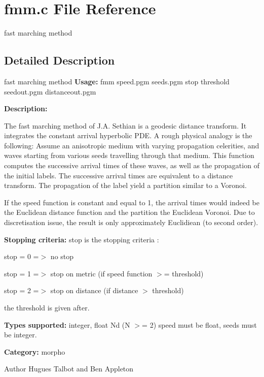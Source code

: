 \section{fmm.c File Reference}
\label{fmm_8c}


fast marching method  




\subsection{Detailed Description}
fast marching method {\bfseries Usage:} fmm speed.pgm seeds.pgm stop threshold seedout.pgm distanceout.pgm

{\bfseries Description:}

The fast marching method of J.A. Sethian is a geodesic distance transform. It integrates the constant arrival hyperbolic PDE. A rough physical analogy is the following: Assume an anisotropic medium with varying propagation celerities, and waves starting from various seeds travelling through that medium. This function computes the successive arrival times of these waves, as well as the propagation of the initial labels. The successive arrival times are equivalent to a distance transform. The propagation of the label yield a partition similar to a Voronoi.

If the speed function is constant and equal to 1, the arrival times would indeed be the Euclidean distance function and the partition the Euclidean Voronoi. Due to discretisation issue, the result is only approximately Euclidiean (to second order).

{\bfseries Stopping criteria:} stop is the stopping criteria :

\begin{DoxyItemize}
\item stop = 0 =$>$ no stop \item stop = 1 =$>$ stop on metric (if speed function $>$= threshold) \item stop = 2 =$>$ stop on distance (if distance $>$ threshold)\end{DoxyItemize}
the threshold is given after.

{\bfseries Types supported:} integer, float Nd (N $>$= 2) speed must be float, seeds must be integer.

{\bfseries Category:} morpho

\begin{DoxyAuthor}{Author}
Hugues Talbot and Ben Appleton 
\end{DoxyAuthor}
